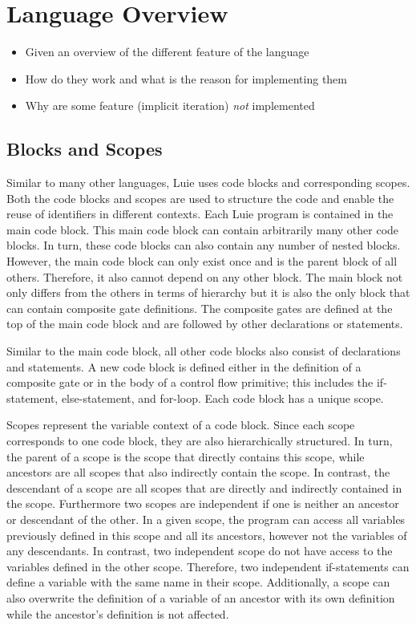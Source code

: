 \section{Language Overview}
\begin{itemize}
    \item Given an overview of the different feature of the language
    \item How do they work and what is the reason for implementing them
    \item Why are some feature (\eg implicit iteration) \emph{not} implemented
\end{itemize}

\subsection{Blocks and Scopes}
\label{sec:concept_blocksAndScope}
Similar to many other languages, Luie uses code blocks and corresponding scopes. Both the code blocks and scopes are used to structure the code and enable the reuse of identifiers in different contexts. Each Luie program is contained in the main code block. This main code block can contain arbitrarily many other code blocks. In turn, these code blocks can also contain any number of nested blocks. However, the main code block can only exist once and is the parent block of all others. Therefore, it also cannot depend on any other block. The main block not only differs from the others in terms of hierarchy but it is also the only block that can contain composite gate definitions. The composite gates are defined at the top of the main code block and are followed by other declarations or statements. 

Similar to the main code block, all other code blocks also consist of declarations and statements. A new code block is defined either in the definition of a composite gate or in the body of a control flow primitive; this includes the if-statement, else-statement, and for-loop. Each code block has a unique scope.

Scopes represent the variable context of a code block. Since each scope corresponds to one code block, they are also hierarchically structured. In turn, the parent of a scope is the scope that directly contains this scope, while ancestors are all scopes that also indirectly contain the scope.
In contrast, the descendant of a scope are all scopes that are directly and indirectly contained in the scope. Furthermore two scopes are independent if one is neither an ancestor or descendant of the other.  
In a given scope, the program can access all variables previously defined in this scope and all its ancestors, however not the variables of any descendants.  
In contrast, two independent scope do not have access to the variables defined in the other scope. Therefore, two independent if-statements can define a variable with the same name in their scope. Additionally, a scope can also overwrite the definition of a variable of an ancestor with its own definition while the ancestor's definition is not affected.

